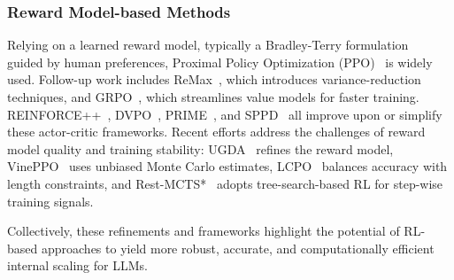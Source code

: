 \subsubsection{Reward Model-based Methods}
Relying on a learned reward model, typically a Bradley-Terry formulation~\citep{zheng2023secrets} guided by human preferences, Proximal Policy Optimization (PPO)~\citep{schulman2017proximalpolicyoptimizationalgorithms} is widely used. 
Follow-up work includes ReMax~\citep{li2023remax}, which introduces variance-reduction techniques, and GRPO~\citep{shao2024deepseekmath}, which streamlines value models for faster training. 
REINFORCE++~\citep{hu2025reinforce++}, DVPO~\citep{huang2025lean}, PRIME~\citep{cui2025process}, and SPPD~\citep{yi2025sppd} all improve upon or simplify these actor-critic frameworks. 
Recent efforts address the challenges of reward model quality and training stability: UGDA~\citep{sun2025uncertain} refines the reward model, VinePPO~\citep{kazemnejad2024vineppo} uses unbiased Monte Carlo estimates, LCPO~\citep{aggarwal2025l1} balances accuracy with length constraints, and Rest-MCTS*~\citep{zhang2024rest} adopts tree-search-based RL for step-wise training signals.

Collectively, these refinements and frameworks highlight the potential of RL-based approaches to yield more robust, accurate, and computationally efficient internal scaling for LLMs.
